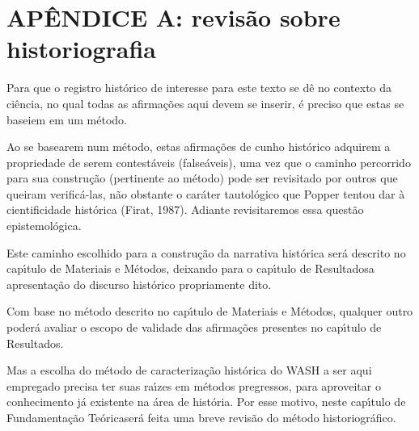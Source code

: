 \documentclass[
12pt,		%
openright,	%
twoside,  %
a4paper,			%
chapter=TITLE,		%
english,			%
french,				%
spanish,			%
brazil				%
]{USPSC-classe/USPSC}
\begin{document}
\chapter[AP\^ENDICE A: revis\~ao sobre historiografia]{AP\^ENDICE A: revis\~ao sobre historiografia}\label{AP\^ENDICE A: revis\~ao sobre historiografia}
Para que o registro hist\'orico de interesse para este texto se d\^e no contexto da ci\^encia, no qual todas as afirma\c{c}\~oes aqui devem se inserir, \'e preciso que estas se baseiem em um m\'etodo.










Ao se basearem num m\'etodo, estas afirma\c{c}\~oes de cunho hist\'orico adquirem a propriedade de serem contest\'aveis (false\'aveis), uma vez que o caminho percorrido para sua constru\c{c}\~ao (pertinente ao m\'etodo) pode ser revisitado por outros que queiram verific\'a-las, n\~ao obstante o car\'ater tautol\'ogico que Popper tentou dar \`a cientificidade hist\'orica  (Firat, 1987). Adiante revisitaremos essa quest\~ao epistemol\'ogica.










Este caminho escolhido para a constru\c{c}\~ao da narrativa hist\'orica ser\'a descrito no cap\'{\i}tulo de \textquotedbl Materiais e M\'etodos\textquotedbl , deixando para o cap\'{\i}tulo de \textquotedbl Resultados\textquotedbl  a apresenta\c{c}\~ao do discurso hist\'orico propriamente dito.










Com base no m\'etodo descrito no cap\'{\i}tulo de \textquotedbl Materiais e M\'etodos\textquotedbl , qualquer outro poder\'a avaliar o escopo de validade das afirma\c{c}\~oes presentes no cap\'{\i}tulo de \textquotedbl Resultados\textquotedbl .










Mas a escolha do m\'etodo de caracteriza\c{c}\~ao hist\'orica do WASH a ser aqui empregado precisa ter suas ra\'{\i}zes em m\'etodos pregressos, para aproveitar o conhecimento j\'a existente na \'area de hist\'oria. Por esse motivo, neste cap\'{\i}tulo de \textquotedbl Fundamenta\c{c}\~ao Te\'orica\textquotedbl  ser\'a feita uma breve revis\~ao do m\'etodo historiogr\'afico.
\end{document}

